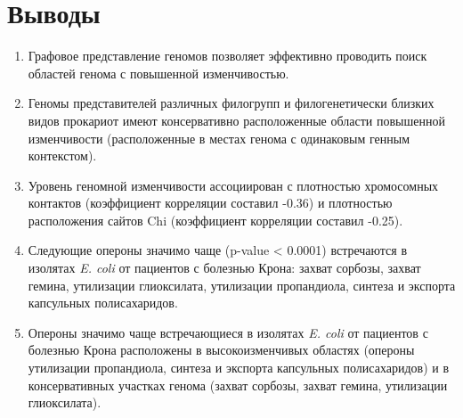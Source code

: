 \chapter{Выводы}

\begin{enumerate}
    \item Графовое представление геномов позволяет эффективно проводить поиск областей генома с повышенной изменчивостью.
  
      \item Геномы представителей различных филогрупп и филогенетически близких видов прокариот имеют консервативно расположенные области повышенной изменчивости (расположенные в местах генома с одинаковым генным контекстом).
  
       \item Уровень геномной изменчивости ассоциирован с плотностью хромосомных контактов (коэффициент корреляции составил -0.36) и плотностью расположения сайтов Chi (коэффициент корреляции составил -0.25).
  
      \item Следующие опероны значимо чаще (p-value < 0.0001) встречаются в изолятах \textit{E. coli} от пациентов с болезнью Крона: захват сорбозы, захват гемина, утилизации глиоксилата, утилизации пропандиола, синтеза и экспорта капсульных полисахаридов.
  
      \item Опероны значимо чаще встречающиеся в изолятах \textit{E. coli} от пациентов с болезнью Крона расположены в высокоизменчивых областях (опероны утилизации пропандиола, синтеза и экспорта капсульных полисахаридов) и в консервативных участках генома (захват сорбозы, захват гемина, утилизации глиоксилата).
    
    \end{enumerate}